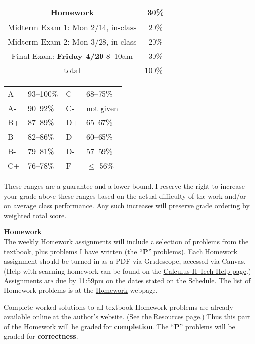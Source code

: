 \documentclass[12pt]{article}
\renewcommand{\emph}[1]{\textsf{\textbf{#1}}}
\newcommand{\localhead}[1]{\par\smallskip\textbf{#1} \smallskip\nobreak\\}%
\def\heading#1{\localhead{\large\emph{#1}}}
\begin{document}
\begin{multicols}{2}
\begin{tabular}{|c|c|}
\hline
Homework & 30\% \\
\hline
Midterm Exam 1: Mon 2/14, in-class & 20\% \\
\hline
Midterm Exam 2: Mon 3/28, in-class & 20\%  \\
\hline
Final Exam: \emph{Friday 4/29} 8--10am & 30\% \\
\hline
total & 100\% \, \\
\hline
\end{tabular}

\begin{tabular}{llll}
A  & 93--100\%& C  & 68--75\%  \\
A- & 90--92\% & C- & not given \\
B+ & 87--89\% & D+ & 65--67\%  \\
B  & 82--86\% & D  & 60--65\%  \\
B- & 79--81\% & D- & 57--59\%  \\
C+ & 76--78\% & F  & $\le$ 56\%
\end{tabular}
\end{multicols}

\vspace{-3mm}
These ranges are a guarantee and a lower bound. I reserve the right to increase your grade above these ranges based on the actual difficulty of the work and/or on average class performance. Any such increases will preserve grade ordering by weighted total score. 


\heading{Homework}
The weekly Homework assignments will include a selection of problems from the textbook, plus problems I have written (the ``\textbf{P}'' problems).  Each Homework assignment should be turned in as a PDF via Gradescope, accessed via Canvas.  (Help with scanning homework can be found on the \href{https://uaf-math251.github.io/techHelp.html}{Calculus II Tech Help page}.)  Assignments are due by 11:59pm on the dates stated on the \href{https://bueler.github.io/math314/assets/general/schedule.pdf}{Schedule}.  The list of Homework problems is at the \href{https://bueler.github.io/math314/homework.html}{Homework} webpage.

Complete worked solutions to all textbook Homework problems are already available online at the author's website.  (See the \href{https://bueler.github.io/math314/resources.html}{Resources} page.)  Thus this part of the Homework will be graded for \emph{completion}.  The ``\textbf{P}'' problems will be graded for \emph{correctness}.
\end{document}
